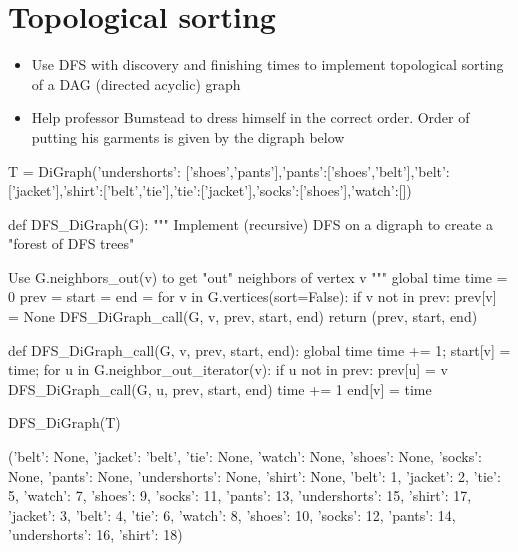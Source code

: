 \section{Topological sorting}

\begin{itemize}
\item Use DFS with discovery and finishing times to implement topological sorting of a DAG (directed acyclic) graph
\item Help professor Bumstead to dress himself in the correct order. Order of putting his garments is given by the digraph below
\end{itemize}

\begin{sageCell}
    T = DiGraph({'undershorts': ['shoes','pants'],'pants':['shoes','belt'],'belt':['jacket'],'shirt':['belt','tie'],'tie':['jacket'],'socks':['shoes'],'watch':[]})
\end{sageCell}

\begin{sageCell}
def DFS_DiGraph(G):
    """
    Implement (recursive) DFS on a digraph to create a
    "forest of DFS trees"

    Use G.neighbors_out(v) to get "out" neighbors of vertex v
    """
    global time
    time = 0
    prev = {}
    start = {}
    end = {}
    for v in G.vertices(sort=False):
        if v not in prev:
            prev[v] = None
            DFS_DiGraph_call(G, v, prev, start, end)
    return (prev, start, end)

def DFS_DiGraph_call(G, v, prev, start, end):
    global time
    time += 1;
    start[v] = time;
    for u in G.neighbor_out_iterator(v):
        if u not in prev:
            prev[u] = v
            DFS_DiGraph_call(G, u, prev, start, end)
    time += 1
    end[v] = time
\end{sageCell}

\begin{sageCell}
    DFS_DiGraph(T)
\end{sageCell}
\begin{outCell}
    ({'belt': None,
      'jacket': 'belt',
      'tie': None,
      'watch': None,
      'shoes': None,
      'socks': None,
      'pants': None,
      'undershorts': None,
      'shirt': None},
     {'belt': 1,
      'jacket': 2,
      'tie': 5,
      'watch': 7,
      'shoes': 9,
      'socks': 11,
      'pants': 13,
      'undershorts': 15,
      'shirt': 17},
     {'jacket': 3,
      'belt': 4,
      'tie': 6,
      'watch': 8,
      'shoes': 10,
      'socks': 12,
      'pants': 14,
      'undershorts': 16,
      'shirt': 18})
\end{outCell}

